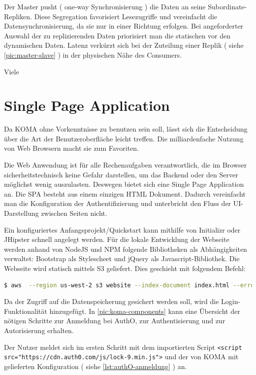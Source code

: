 \documentclass[
12pt,
english,
ngerman,
headsepline,
twoside,
openright,
numbers=noenddot,version=first
]{scrreprt}
\begin{document}
Der Master pusht ( one-way Synchronisierung ) die Daten an seine Subordinate-Repliken. Diese Segregation favorisiert Lesezugriffe und vereinfacht die Datensynchronisierung, da sie nur in einer Richtung erfolgen.
Bei angeforderter Auswahl der zu replizierenden Daten priorisiert man die statischen vor den dynamischen Daten.
Latenz verkürzt sich bei der Zuteilung einer Replik ( siehe  \autoref{pic:master-slave} ) in der physischen Nähe des Consumers.


Viele
\section{Single Page Application}
\label{sec:spa}

Da KOMA ohne Vorkenntnisse zu benutzen sein soll, lässt sich die Entscheidung über die Art der Benutzeroberfläche leicht treffen. Die milliardenfache Nutzung von Web Browsern macht sie zum Favoriten.


Die Web Anwendung ist für alle Rechenaufgaben verantwortlich, die im Browser sicherheitstechnisch keine Gefahr darstellen, um das Backend oder den Server möglichst wenig auszulasten. Deswegen bietet sich eine Single Page Application an. 
Die \acrshort{SPA} besteht aus einem einzigen HTML Dokument. Dadurch vereinfacht man die Konfiguration der Authentifizierung und unterbricht den Fluss der UI-Darstellung zwischen Seiten nicht.

Ein konfiguriertes Anfangsprojekt/Quickstart kann mithilfe von Initializr\cite{Initializr} oder JHipster\cite{Jhipster} schnell angelegt werden. Für die lokale Entwicklung der Webseite werden anhand von NodeJS und NPM folgende Bibliotheken als Abhängigkeiten verwaltet: Bootstrap als Stylescheet und jQuery als Javascript-Bibliothek.
Die Webseite wird statisch mittels S3 geliefert. Dies geschieht mit folgendem Befehl: 
\begin{lstlisting}[language=BASH, caption={Webseite veröffentlichen}]
$ aws  --region us-west-2 s3 website --index-document index.html --error-document error.html 's3://koma.thb.de'
\end{lstlisting} 

Da der Zugriff auf die Datenspeicherung gesichert werden soll, wird die Login-Funktionalität hinzugefügt. In  \autoref{pic:koma-components} kann eine Übersicht der nötigen Schritte zur Anmeldung bei AuthO, zur Authentisierung und zur Autorisierung erhalten.

Der Nutzer meldet sich im ersten Schritt mit dem importierten Script \lstinline|<script src="https://cdn.auth0.com/js/lock-9.min.js">| und der von \acrshort{KOMA} mit gelieferten Konfiguration ( siehe   \autoref{lst:authO-anmeldung} ) an. 
\end{document}
